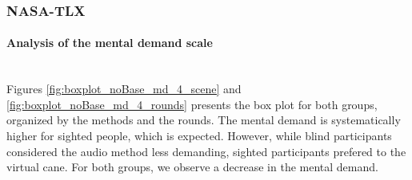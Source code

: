 \subsubsection{NASA-TLX}
\label{subsubsec:results_nasa_tlx_2}

\paragraph*{Analysis of the mental demand scale}\mbox{}\\

Figures \ref{fig:boxplot_noBase_md_4_scene} and \ref{fig:boxplot_noBase_md_4_rounds} presents the box plot for both groups, organized by the methods and the rounds. The mental demand is systematically higher for sighted people, which is expected. However, while blind participants considered the audio method less demanding, sighted participants prefered to the virtual cane. For both groups, we observe a decrease in the mental demand.

